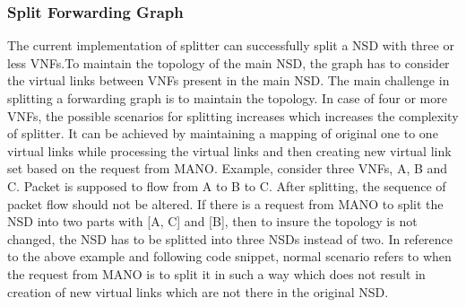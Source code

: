 \subsubsection{Split Forwarding Graph} \label{fgsplitting}
The current implementation of splitter can successfully split a NSD with three or less VNFs.To maintain the topology of the main NSD, the graph has to consider the virtual links between VNFs present in the main NSD. The main challenge in splitting a forwarding graph is to maintain the topology. In case of four or more VNFs, the possible scenarios for splitting increases which increases the complexity of splitter. It can be achieved by maintaining a mapping of original one to one virtual links while processing the virtual links and then creating new virtual link set based on the request from MANO. Example, consider three VNFs, A, B and C. Packet is supposed to flow from A to B to C. After splitting, the sequence of packet flow should not be altered. If there is a request from MANO to split the NSD into two parts with [A, C] and [B], then to insure the topology is not changed, the NSD has to be splitted into three NSDs instead of two. In reference to the above example and following code snippet, normal scenario refers to when the request from MANO is to split it in such a way which does not result in creation of new virtual links which are not there in the original NSD. 

